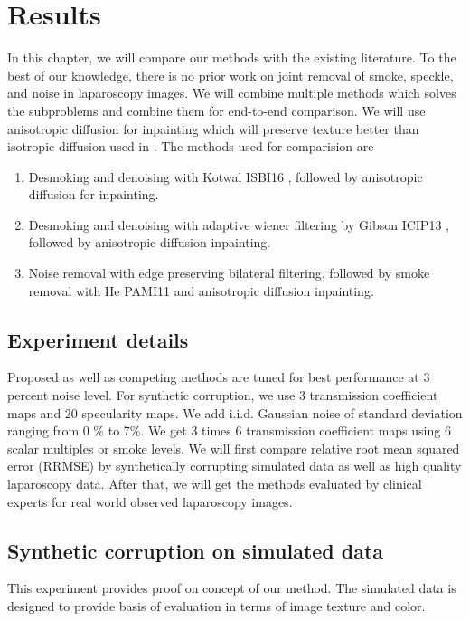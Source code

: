 \chapter{Results}

In this chapter, we will compare our methods with the existing literature. To the best of our knowledge, there is no prior work on joint removal of smoke, speckle, and noise in laparoscopy images. We will combine multiple methods which solves the subproblems and combine them for end-to-end comparison. We will use anisotropic diffusion for inpainting which will preserve texture better than isotropic diffusion used in \cite{saint2011detection, arnold2010speckle}. The methods used for comparision are
\begin{enumerate}
    \item Desmoking and denoising with Kotwal ISBI16 \cite{kotwal2016joint}, followed by anisotropic diffusion for inpainting.
    \item Desmoking and denoising with adaptive wiener filtering by Gibson ICIP13 \cite{gibson2013wiener}, followed by anisotropic diffusion inpainting.
    \item Noise removal with edge preserving bilateral filtering, followed by smoke removal with He PAMI11 \cite{he2011dark} and anisotropic diffusion inpainting.
\end{enumerate}

\section{Experiment details}
Proposed as well as competing methods are tuned for best performance at 3 percent noise level. For synthetic corruption, we use 3 transmission coefficient maps and 20 specularity maps. We add i.i.d. Gaussian noise of standard deviation ranging from 0 \% to 7\%. We get 3 times 6 transmission coefficient maps using 6 scalar multiples or smoke levels. We will first compare relative root mean squared error (RRMSE) by synthetically corrupting simulated data as well as high quality laparoscopy data. After that, we will get the methods evaluated by clinical experts for real world observed laparoscopy images.

\section{Synthetic corruption on simulated data}
This experiment provides proof on concept of our method. The simulated data is designed to provide basis of evaluation in terms of image texture and color.


